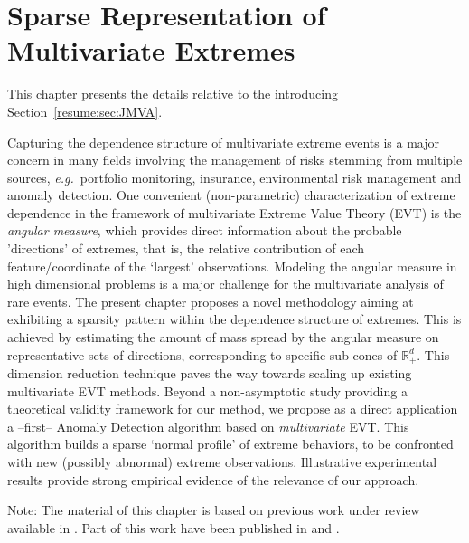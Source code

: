 \chapter{Sparse Representation of Multivariate Extremes}
\label{jmva}


\begin{chapabstract}
This chapter presents the details relative to the introducing Section~\ref{resume:sec:JMVA}.

Capturing the dependence structure of multivariate extreme events is
a major concern in many fields involving the management of risks
stemming from multiple sources, \emph{e.g.}~portfolio monitoring, insurance, environmental risk management and anomaly detection.
One convenient (non-parametric) characterization of  extreme dependence in the
framework of multivariate Extreme Value Theory (EVT) is the \textit{angular
  measure}, which provides direct information about the probable
'directions' of extremes, that is, the relative contribution of each
feature/coordinate of the `largest' observations. Modeling the
angular measure in high dimensional problems is a major challenge for
the multivariate analysis of rare events.
The present chapter proposes a novel methodology aiming at 
exhibiting a sparsity pattern within the dependence structure of extremes. 
This is achieved by estimating the amount of mass spread by the angular measure on
representative sets of directions, corresponding to  specific sub-cones of $\mathbb{R}_+^d$.
This dimension reduction technique  paves the way towards scaling up existing multivariate EVT methods.
Beyond a non-asymptotic study providing a theoretical validity
framework for our method, we propose  as a direct application a --first--
Anomaly Detection algorithm based on \textit{multivariate} EVT.  This algorithm builds a sparse `normal profile' of extreme behaviors, to be confronted with new (possibly abnormal) extreme observations. Illustrative experimental results provide strong empirical evidence of the relevance of our approach.
\end{chapabstract}

Note: The material of this chapter is based on previous work under review available in \cite{ARXIV16}. Part of this work have been published in \cite{AISTAT16} and \cite{NIPSWORKSHOP15}.



